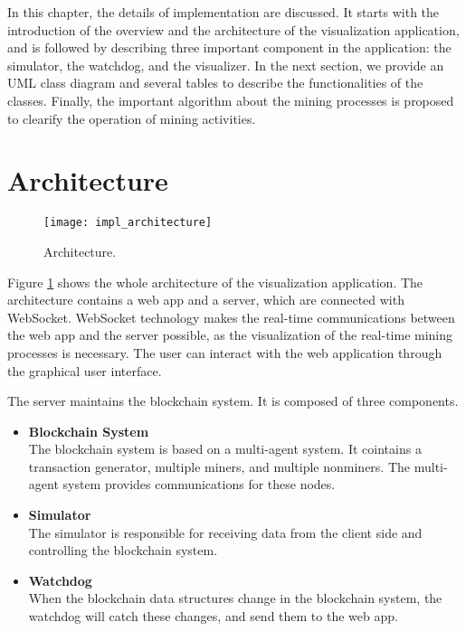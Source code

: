 In this chapter, the details of implementation are discussed. It starts with the introduction of the overview and the architecture of the visualization application, and is followed by describing three important component in the application: the simulator, the watchdog, and the visualizer. In the next section, we provide an UML class diagram and several tables to describe the functionalities of the classes. Finally, the important algorithm about the mining processes is proposed to clearify the operation of mining activities.

\section{Architecture}

\begin{figure}[htb]
    \centering
    \texttt{[image: impl\_architecture]}
    \caption{Architecture.}
    \label{fig:architecture}
\end{figure}

Figure \ref{fig:architecture} shows the whole architecture of the visualization application. The architecture contains a web app and a server, which are connected with WebSocket. WebSocket technology makes the real-time communications between the web app and the server possible, as the visualization of the real-time mining processes is necessary. The user can interact with the web application through the graphical user interface.

The server maintains the blockchain system. It is composed of three components.

\begin{itemize}
    \item \textbf{Blockchain System} \\
        The blockchain system is based on a multi-agent system. It cointains a transaction generator, multiple miners, and multiple nonminers. The multi-agent system provides communications for these nodes.
    \item \textbf{Simulator} \\
        The simulator is responsible for receiving data from the client side and controlling the blockchain system.
    \item \textbf{Watchdog} \\
        When the blockchain data structures change in the blockchain system, the watchdog will catch these changes, and send them to the web app. 
\end{itemize}

